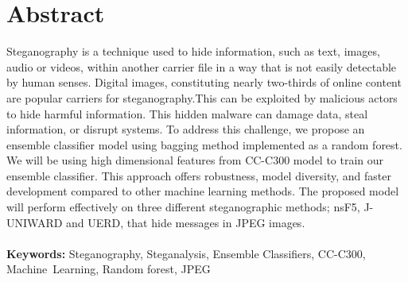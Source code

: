 \chapter*{Abstract} 
\thispagestyle{plain}
\setcounter{page}{1}
\sloppy
Steganography is a technique used to hide information, such as text, images, audio or videos, within another carrier file in a way that is not easily detectable by human senses. Digital images, constituting nearly two-thirds of online content are popular carriers for steganography.This can be exploited by malicious actors to hide harmful information. This hidden malware can damage data, steal information, or disrupt systems. To address this challenge, we propose an ensemble classifier model using bagging method implemented as a random forest. We will be using high dimensional features from CC-C300 model to train our ensemble classifier. This approach offers robustness, model diversity, and faster development compared to other machine learning methods. The proposed model will perform effectively on three different steganographic methods; nsF5, J-UNIWARD and UERD, that hide messages in JPEG images.\\ \\
\normalsize{\textbf{Keywords:} Steganography, Steganalysis, Ensemble Classifiers, CC-C300, \mbox{Machine Learning}, Random forest, JPEG }


